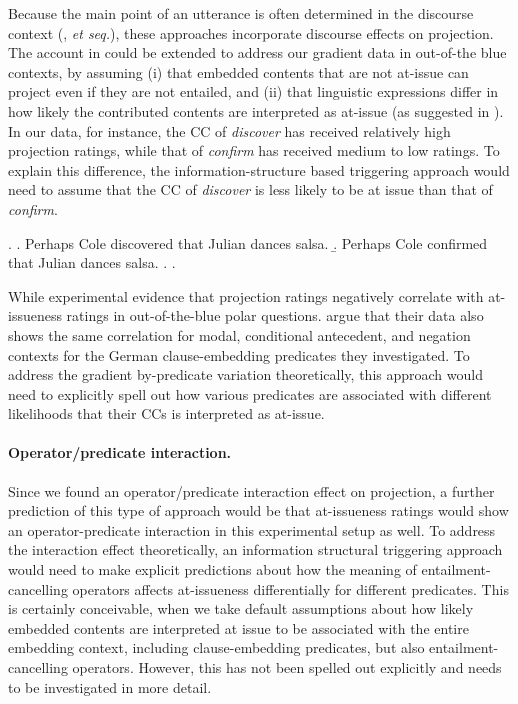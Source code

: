\documentclass[a4paper,12pt,twoside]{article}
\begin{document}
		Because the main point of an utterance is often determined in the discourse context (\citealt{roberts_information_1996,roberts_information_2012}, \emph{et seq.}), these approaches incorporate discourse effects on projection.
		The account in \citealt{simons_best_2017} could be extended to address our gradient data in out-of-the blue contexts, by assuming (i) that embedded contents that are not at-issue can project even if they are not entailed, and (ii) that linguistic expressions differ in how likely the contributed contents are interpreted as at-issue (as suggested in \citealt{tonhauser_how_2018}).
		In our data, for instance, the CC of \emph{discover} \Next[a] has received relatively high projection ratings, while that of \emph{confirm} \Next[b] has received medium to low ratings. To explain this difference, the information-structure based triggering approach would need to assume that the CC of \emph{discover} is less likely to be at issue than that of \emph{confirm}.

		\ex. \a. Perhaps Cole discovered that Julian dances salsa.
			\b. Perhaps Cole confirmed that Julian dances salsa.
			\z.
		\z.

		While \citet{tonhauser_how_2018} experimental evidence that projection ratings negatively correlate with at-issueness ratings in out-of-the-blue polar questions. \citet{sieker_projective_2022} argue that their data also shows the same correlation for modal, conditional antecedent, and negation contexts for the German clause-embedding predicates they investigated. To address the gradient by-predicate variation theoretically, this approach would need to explicitly spell out how various predicates are associated with different likelihoods that their CCs is interpreted as at-issue.

		\paragraph{Operator/predicate interaction.}
			Since we found an operator/predicate interaction effect on projection, a further prediction of this type of approach would be that at-issueness ratings would show an operator-predicate interaction in this experimental setup as well. To address the interaction effect theoretically, an information structural triggering approach would need to make explicit predictions about how the meaning of entailment-cancelling operators affects at-issueness differentially for different predicates. This is certainly conceivable, when we take default assumptions about how likely embedded contents are interpreted at issue to be associated with the entire embedding context, including clause-embedding predicates, but also entailment-cancelling operators. However, this has not been spelled out explicitly and needs to be investigated in more detail.
			
\end{document}
